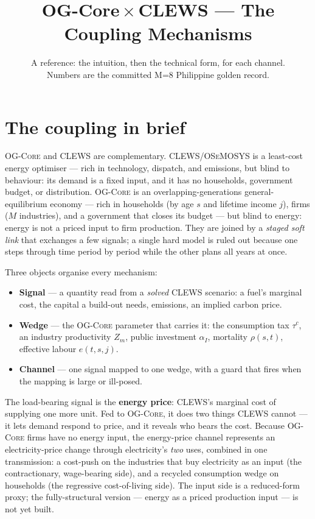\documentclass[11pt]{article}
\title{\vspace{-1.2cm}\bfseries OG-Core\,$\times$\,CLEWS --- The Coupling Mechanisms}
\author{}
\date{A reference: the intuition, then the technical form, for each channel.\\
\small Numbers are the committed M=8 Philippine golden record.}
\newcommand{\OGCore}{\textsc{OG-Core}}
\newcommand{\CLEWS}{\textsc{CLEWS}}
\newcommand{\OSeMOSYS}{\textsc{OSeMOSYS}}
\newcommand{\tauc}{\tau^{c}}
\newcommand{\alphaI}{\alpha_{I}}
\begin{document}
\maketitle
\vspace{-0.8cm}

\section{The coupling in brief}

\OGCore{} and \CLEWS{} are complementary. \CLEWS{}/\OSeMOSYS{} is a least-cost energy
optimiser --- rich in technology, dispatch, and emissions, but blind to behaviour: its
demand is a fixed input, and it has no households, government budget, or distribution.
\OGCore{} is an overlapping-generations general-equilibrium economy --- rich in
households (by age $s$ and lifetime income $j$), firms ($M$ industries), and a
government that closes its budget --- but blind to energy: energy is not a priced input
to firm production. They are joined by a \emph{staged soft link} that exchanges a few
signals; a single hard model is ruled out because one steps through time period by
period while the other plans all years at once.

Three objects organise every mechanism:
\begin{itemize}
  \item \textbf{Signal} --- a quantity read from a \emph{solved} \CLEWS{} scenario: a
    fuel's marginal cost, the capital a build-out needs, emissions, an implied carbon price.
  \item \textbf{Wedge} --- the \OGCore{} parameter that carries it: the consumption tax
    $\tauc$, an industry productivity $Z_m$, public investment $\alphaI$, mortality
    $\rho(s,t)$, effective labour $e(t,s,j)$.
  \item \textbf{Channel} --- one signal mapped to one wedge, with a guard that fires
    when the mapping is large or ill-posed.
\end{itemize}

The load-bearing signal is the \textbf{energy price}: \CLEWS{}'s marginal cost of
supplying one more unit. Fed to \OGCore{}, it
does two things \CLEWS{} cannot --- it lets demand respond to price, and it reveals who
bears the cost. Because \OGCore{} firms have no energy input, the energy-price channel represents an
electricity-price change through electricity's \emph{two} uses, combined in one
transmission: a cost-push on the industries that buy electricity as an input (the
contractionary, wage-bearing side), and a recycled consumption wedge on households (the
regressive cost-of-living side). The input side is a reduced-form proxy; the
fully-structural version --- energy as a priced production input --- is not yet built.
\end{document}
